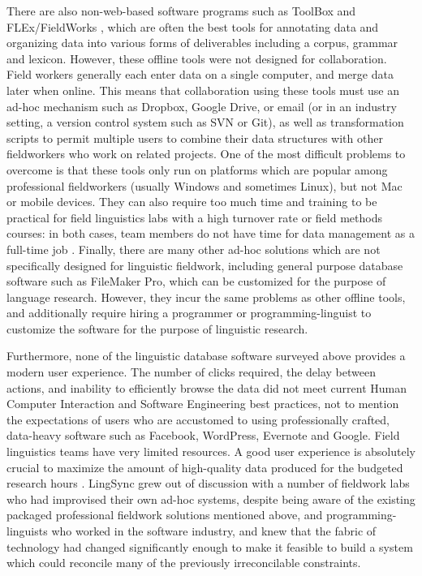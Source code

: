 \documentclass[letterpaper, 12pt, dvips]{mitwpl}
\begin{document}
There are also non-web-based software programs such as ToolBox \citep{ToolBox:2003:Online} 
and FLEx/FieldWorks
\citep{FLEx:2011:Online},
which are often the best tools for annotating
data and organizing data into various forms of deliverables  
including a corpus,
grammar and lexicon.
However, these offline tools were not designed for collaboration. 
Field workers generally each enter data on a single computer,
and merge data later when online.
This means that collaboration using these tools must use an ad-hoc mechanism such as Dropbox, Google Drive, or email (or in an industry setting, a version control system such as SVN or Git),
as well as transformation scripts to permit multiple users to combine their data structures with other fieldworkers who work on related projects.
One of the most difficult problems to overcome is that 
these tools only run on platforms which are popular among professional fieldworkers  (usually Windows and sometimes Linux), but 
not Mac or mobile devices.
They can also require too much time and training to be practical for field linguistics labs with a high turnover rate or field methods courses: in both cases, team members do not have time for data management as a full-time job \citep{Butler:2007}. 
Finally, there are many other ad-hoc solutions which are not specifically designed for linguistic fieldwork, including general purpose database software such as FileMaker Pro,
which can be customized for the purpose of language research.
However,
they incur the same problems as other offline tools, and additionally require hiring a programmer or programming-linguist to customize the software for the purpose of linguistic research.

Furthermore, none of the linguistic database software surveyed above provides a modern user experience.
The number of clicks required, the delay between actions, and inability to efficiently browse the data did not meet current
Human Computer Interaction and Software Engineering best practices, 
not to mention the expectations of users who are accustomed to using professionally crafted, data-heavy software such as Facebook, WordPress, Evernote and Google. %
Field linguistics teams have very limited resources. 
A good user
experience is absolutely crucial to maximize the amount of high-quality data produced for the budgeted research hours \citep{Palmer:2009}. 
LingSync grew
out of discussion with a number of fieldwork labs who had improvised their own ad-hoc systems, 
despite being aware of the existing packaged professional fieldwork solutions mentioned above, 
and programming-linguists who worked in the software industry, and knew that the fabric of technology had changed significantly enough to make it feasible to build a system which could reconcile many of the previously irreconcilable constraints.
\end{document}
